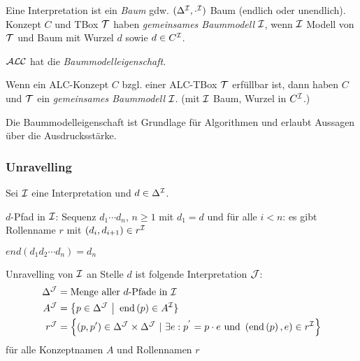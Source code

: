 Eine Interpretation ist ein \emph{Baum} gdw. $(\Delta^{\mathcal{I}}, \cdot^{\mathcal{I}})$
Baum (endlich oder unendlich). Konzept $C$ und TBox $\mathcal{T}$ haben
\emph{gemeinsames Baummodell} $\mathcal{I}$, wenn $\mathcal{I}$ Modell von $\mathcal{T}$ und Baum mit
Wurzel $d$ sowie $d \in C^{\mathcal{I}}$.


$\mathcal{A}\mathcal{L}\mathcal{C}$ hat die \emph{Baummodelleigenschaft}.

\begin{theorem}
    \label{theorem-3.6}
    \label{thm:baummodell}
Wenn ein ALC-Konzept $C$ bzgl. einer ALC-TBox $\mathcal{T}$ erfüllbar ist,
dann haben $C$ und $\mathcal{T}$ ein \emph{gemeinsames Baummodell} $\mathcal{I}$. (mit $\mathcal{I}$ Baum, Wurzel in $C^{\mathcal{I}}$.)
\end{theorem}

\begin{tafel}[TODO]

\end{tafel}

Die Baummodelleigenschaft ist Grundlage für Algorithmen und erlaubt Aussagen über die Ausdrucksstärke.

\subsubsection{Unravelling}\label{unravelling}

Sei $\mathcal{I}$ eine Interpretation und $d \in \Delta^{\mathcal{I}}$. 

$d$-Pfad in $\mathcal{I}$: Sequenz $d_{1}\cdots d_n$, $n \geq 1$ mit $d_1 = d$ und
für alle $i < n$: es gibt Rollenname $r$ mit $(d_i, d_{i + 1}) \in r^{\mathcal{I}}$

$\mathit{end}(d_1d_2\cdots d_n) = d_n$

\begin{definition}[Unravelling]
Unravelling von $\mathcal{I}$ an Stelle $d$ ist folgende Interpretation $\mathcal{J}$:
\begin{align*}
    \Delta^{\MJ} &= \text{Menge aller }d\text{-Pfade in }\MI\\
    A^{\MJ} &= \left\{ p \in \Delta^{\MJ}\  \right|\text{\ end}\left( p \right) \in A^{\MI}\}\\
    r^{\MJ} &= \left\{ \left( p,p' \right) \in \Delta^{\MJ} \times \Delta^{\MJ}\ |\ \exists e:p^{'} = p \cdot e\ \mathrm{\text{und}}\ \left( \text{end}\left( p \right),e \right) \in r^{\MI} \right\}
\end{align*}
für alle Konzeptnamen $A$ und Rollennamen $r$
\end{definition}

\begin{tafel}[TODO]

\end{tafel}

